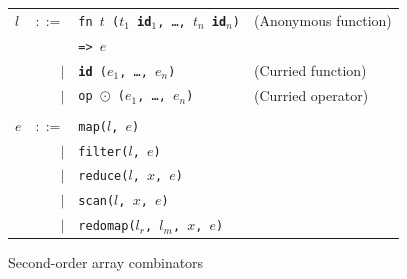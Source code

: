 \documentclass{sigplanconf}  %
\begin{document}
\begin{figure}[bt]
\begin{tabular}{lrll}
$l$ & $::=$ & {\tt fn $t$ ($t_{1}$ {\bf id}$_{1}$, \ldots, $t_{n}$ {\bf id}$_{n}$)} & (Anonymous function) \\
&     & {\tt => $e$} \\
& $|$ & {\tt {\bf id} ($e_{1}$, \ldots, $e_{n}$)} & (Curried function) \\
& $|$ & {\tt op $\odot$ ($e_{1}$, \ldots, $e_{n}$)} & (Curried operator) \\
\\
$e$ & $::=$ & {\tt map($l$, $e$)} \\
    & $|$ & {\tt filter($l$, $e$)} \\
    & $|$ & {\tt reduce($l$, $x$, $e$)} \\
    & $|$ & {\tt scan($l$, $x$, $e$)} \\
    & $|$ & {\tt redomap($l_{r}$, $l_{m}$, $x$, $e$)} \\
\end{tabular}
\caption{Second-order array combinators}
\label{fig:soacs}
\end{figure}
\end{document}
